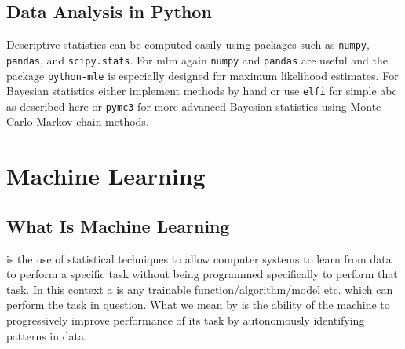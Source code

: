\documentclass[a4paper]{article}
\begin{document}
    \subsection{Data Analysis in Python}
    Descriptive statistics can be computed easily using packages such as \lstinline|numpy|, \lstinline|pandas|, and \lstinline|scipy.stats|.
    For \gls{mlm} again \lstinline|numpy| and \lstinline|pandas| are useful and the package \lstinline|python-mle| is especially designed for maximum likelihood estimates.
    For Bayesian statistics either implement methods by hand or use \lstinline|elfi| for simple \gls{abc} as described here or \lstinline|pymc3| for more advanced Bayesian statistics using Monte Carlo Markov chain methods.
    
    \section{Machine Learning}\label{sec:machine learning}
    \subsection{What Is Machine Learning}
     is the use of statistical techniques to allow computer systems to learn from data to perform a specific task without being programmed specifically to perform that task.
    In this context a  is any trainable function/algorithm/model etc. which can perform the task in question.
    What we mean by  is the ability of the machine to progressively improve performance of its task by autonomously identifying patterns in data.
    
\end{document}
